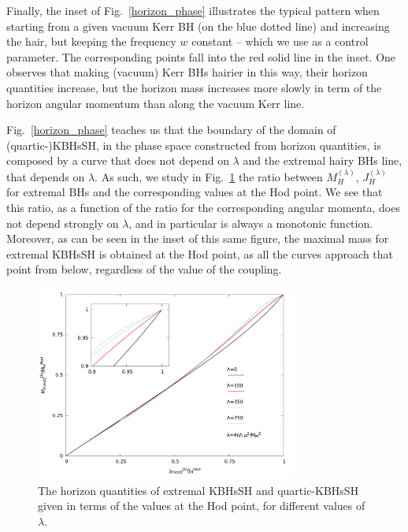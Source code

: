 Finally, the inset of Fig.~\ref{horizon_phase} illustrates the typical pattern when starting from a given vacuum Kerr BH (on the blue dotted line) and increasing the hair, but keeping the frequency $w$ constant -- which we use as a control parameter. The corresponding points fall into the red solid line in the inset. One observes that making (vacuum) Kerr BHs hairier in this way, their horizon quantities increase, but the horizon mass increases more slowly in term of the horizon angular momentum than along the vacuum Kerr line. 


Fig.~\ref{horizon_phase} teaches us that the boundary of the domain of (quartic-)KBHsSH, in the phase space constructed from horizon quantities, is composed by a curve that does not depend on $\lambda$ and the extremal hairy BHs line, that depends on $\lambda$.  As such, we study in Fig.~\ref{horizon_ratios}
the ratio between $M_H^{(\lambda)}$, $J_H^{(\lambda)}$ for extremal BHs and the corresponding values at the Hod point. We see that this ratio, as a function of the ratio for the corresponding angular momenta, does not depend strongly on $\lambda$, and in particular is always a monotonic function. Moreover, as can be seen in the inset of this same figure, the maximal mass for extremal KBHsSH is obtained at the Hod point, as all the curves approach that point from below, regardless of the value of the coupling.

\begin{figure}[h!]
  \begin{center}
    \includegraphics[width=8.55cm]{papers/selfInteractions/horizon-ratios.png}
      \end{center}
      \caption{ The horizon quantities of extremal  KBHsSH and quartic-KBHsSH given in terms of the values at the Hod point, for different values of $\lambda$.}
  \label{horizon_ratios}
\end{figure}

